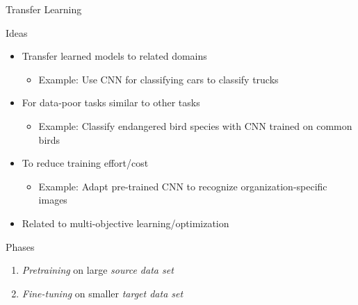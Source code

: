 \documentclass[ignorenonframetext,xcolor=x11names]{beamer}
\begin{document}
\begin{frame}{Transfer Learning}

\begin{block}{Ideas}
\begin{itemize}
   \item Transfer learned models to related domains
   \begin{itemize}
      \item Example: Use CNN for classifying cars to classify trucks
   \end{itemize}
   \item For data-poor tasks similar to other tasks
   \begin{itemize}
      \item Example: Classify endangered bird species with CNN trained on common birds
   \end{itemize}
   \item To reduce training effort/cost
   \begin{itemize}
      \item Example: Adapt pre-trained CNN to recognize organization-specific images
   \end{itemize}
   \item Related to multi-objective learning/optimization
\end{itemize}
\end{block}

\begin{block}{Phases}
\begin{enumerate}
   \item \emph{Pretraining} on large \emph{source data set}
   \item \emph{Fine-tuning} on smaller \emph{target data set}
\end{enumerate}
\end{block}
\end{frame}
\end{document}
